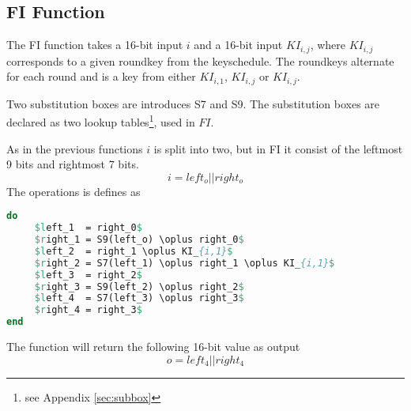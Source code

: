 \subsection{FI Function}
The FI function takes a 16-bit input $i$ and a 16-bit input $KI_{i,j}$,
where $KI_{i,j}$ corresponds to a given roundkey from the keyschedule. The
roundkeys alternate for each round and is a key from either $KI_{i,1}$, $KI_{i,j}$
or $KI_{i,j}$.

Two substitution boxes are introduces S7 and S9. The substitution
boxes are declared as two lookup tables\footnote{see Appendix
  \ref{sec:subbox}}, used in $FI$.

As in the previous functions $i$ is split into two, but in FI it
consist of the leftmost 9 bits and rightmost 7 bits.
\[ i = left_o || right_o \]
The operations is defines as
\begin{lstlisting}[frame=single, language=Pascal, mathescape,
captionpos=b, caption={Pseudo code for $FI$ function}]
do
     $left_1  = right_0$
     $right_1 = S9(left_o) \oplus right_0$
     $left_2  = right_1 \oplus KI_{i,1}$
     $right_2 = S7(left_1) \oplus right_1 \oplus KI_{i,1}$
     $left_3  = right_2$
     $right_3 = S9(left_2) \oplus right_2$
     $left_4  = S7(left_3) \oplus right_3$
     $right_4 = right_3$
end
\end{lstlisting}
The function will return the following 16-bit value as output
\[o = left_4 || right_4\]

